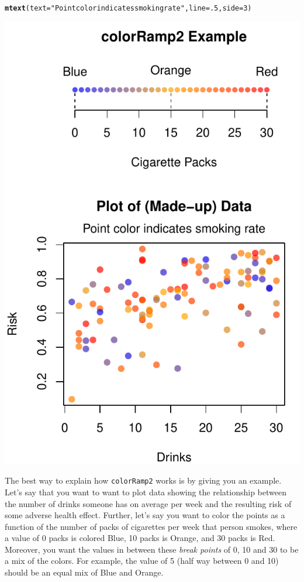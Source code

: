 \documentclass{tufte-book}\usepackage[]{graphicx}\usepackage[]{color}
\makeatletter
\def\maxwidth{ %
  \ifdim\Gin@nat@width>\linewidth
    \linewidth
  \else
    \Gin@nat@width
  \fi
}
\newcommand{\hlnum}[1]{\textcolor[rgb]{0.686,0.059,0.569}{#1}}%
\newcommand{\hlstr}[1]{\textcolor[rgb]{0.192,0.494,0.8}{#1}}%
\newcommand{\hlstd}[1]{\textcolor[rgb]{0.345,0.345,0.345}{#1}}%
\newcommand{\hlkwc}[1]{\textcolor[rgb]{0.333,0.667,0.333}{#1}}%
\newcommand{\hlkwd}[1]{\textcolor[rgb]{0.737,0.353,0.396}{\textbf{#1}}}%
\newenvironment{kframe}{%
 \def\at@end@of@kframe{}%
 \ifinner\ifhmode%
  \def\at@end@of@kframe{\end{minipage}}%
  \begin{minipage}{\columnwidth}%
 \fi\fi%
 \def\FrameCommand##1{\hskip\@totalleftmargin \hskip-\fboxsep
 \colorbox{shadecolor}{##1}\hskip-\fboxsep
     \hskip-\linewidth \hskip-\@totalleftmargin \hskip\columnwidth}%
 \MakeFramed {\advance\hsize-\width
   \@totalleftmargin\z@ \linewidth\hsize
   \@setminipage}}%
 {\par\unskip\endMakeFramed%
 \at@end@of@kframe}
\newenvironment{knitrout}{}{} %
\makeatother
\begin{document}
\begin{footnotesize}
\begin{marginfigure}
\begin{tiny}
\begin{knitrout}
\begin{kframe}
\begin{alltt}
\hlkwd{mtext}\hlstd{(}\hlkwc{text} \hlstd{=} \hlstr{"Point color indicates smoking rate"}\hlstd{,} \hlkwc{line} \hlstd{=} \hlnum{.5}\hlstd{,} \hlkwc{side} \hlstd{=} \hlnum{3}\hlstd{)}
\end{alltt}
\end{kframe}
\includegraphics[width=\maxwidth]{figure/unnamed-chunk-176-1} 

\end{knitrout}
\end{tiny}
\label{fig:colorramp}
\end{marginfigure}


The best way to explain how \texttt{colorRamp2} works is by giving you an example. Let's say that you want to want to plot data showing the relationship between the number of drinks someone has on average per week and the resulting risk of some adverse health effect. Further, let's say you want to color the points as a function of the number of packs of cigarettes per week that person smokes, where a value of 0 packs is colored Blue, 10 packs is Orange, and 30 packs is Red. Moreover, you want the values in between these \textit{break points} of 0, 10 and 30 to be a mix of the colors. For example, the value of 5 (half way between 0 and 10) should be an equal mix of Blue and Orange.


\end{footnotesize}
\end{document}
